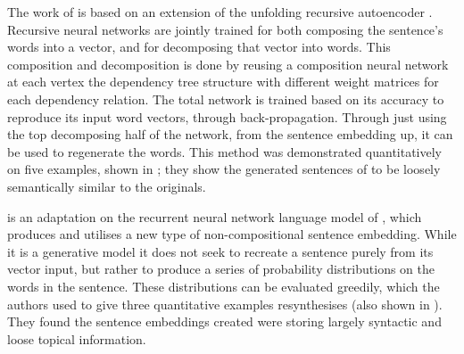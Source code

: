 \documentclass[11pt]{article}
\theoremstyle{plain}
\theoremstyle{definition}
\begin{document}
The work of \textcite{iyyer2014generating} is based on an extension of the unfolding recursive autoencoder \textcite{SocherEtAl2011:PoolRAE}. Recursive neural networks are jointly trained for both composing the sentence's words into a vector, and for decomposing that vector into words. This composition and decomposition is done by reusing a composition neural network at each vertex the  dependency tree structure with different weight matrices for each dependency relation. The total network is trained based on its accuracy to reproduce its input word vectors, through back-propagation. Through just using the top decomposing half of the network, from the sentence embedding up, it can be used to regenerate the words. This method was demonstrated quantitatively on five examples, shown in ; they show the generated sentences of \textcite{iyyer2014generating} to be loosely semantically similar to the originals.

 
 


\textcite{Bowman2015SmoothGeneration} is an adaptation on the recurrent neural network language model of \textcite{mikolov2011RnnLM}, which produces and utilises a new type of non-compositional sentence embedding.  While it is a generative model it does not seek to recreate a sentence purely from its vector input, but rather to produce a series of probability distributions on the words in the sentence. These distributions can be evaluated greedily, which the authors used to give three quantitative examples resynthesises (also shown in ). They found the sentence embeddings created were storing largely syntactic and loose topical information. 
\end{document}
